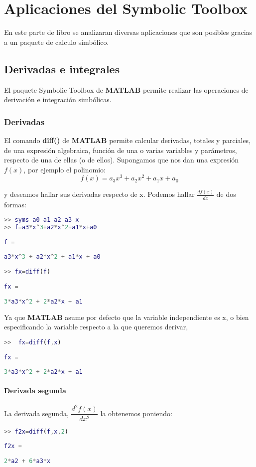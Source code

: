 \chapter{Aplicaciones del Symbolic Toolbox}

En este parte de libro se analizaran diversas aplicaciones que son posibles gracias a un paquete de calculo simbólico.

\section{Derivadas e integrales}

El paquete Symbolic Toolbox de \textbf{MATLAB} permite realizar las operaciones de derivación e integración simbólicas.

\subsection{Derivadas}
El comando \textbf{diff()} de \textbf{MATLAB} permite calcular derivadas, totales y parciales, de una expresión algebraica, función de una o varias variables y parámetros, respecto de una de ellas (o de ellos). Supongamos que nos dan una expresión $f(x)$, por ejemplo el polinomio:
$$f(x) = a_{3}x^3 + a_{2}x^2 + a_{1}x + a_{0}$$


y deseamos hallar sus derivadas respecto de x. Podemos hallar $\frac{df(x)}{dx}$ de dos formas:

\begin{lstlisting}[language=Matlab]
>> syms a0 a1 a2 a3 x
>> f=a3*x^3+a2*x^2+a1*x+a0
 
f =
 
a3*x^3 + a2*x^2 + a1*x + a0
 
>> fx=diff(f)
 
fx =
 
3*a3*x^2 + 2*a2*x + a1

\end{lstlisting}

Ya que \textbf{MATLAB} asume por defecto que la variable independiente es x, o bien especificando la variable respecto a la que queremos derivar,

\begin{lstlisting}[language=Matlab]
>>  fx=diff(f,x)
 
fx =
 
3*a3*x^2 + 2*a2*x + a1

\end{lstlisting}


\subsubsection{Derivada segunda} 
La derivada segunda, $\dfrac{d^{2}f(x)}{dx^{2}}$ la obtenemos poniendo:
\begin{lstlisting}[language=Matlab]
>> f2x=diff(f,x,2)
 
f2x =
 
2*a2 + 6*a3*x

\end{lstlisting}


